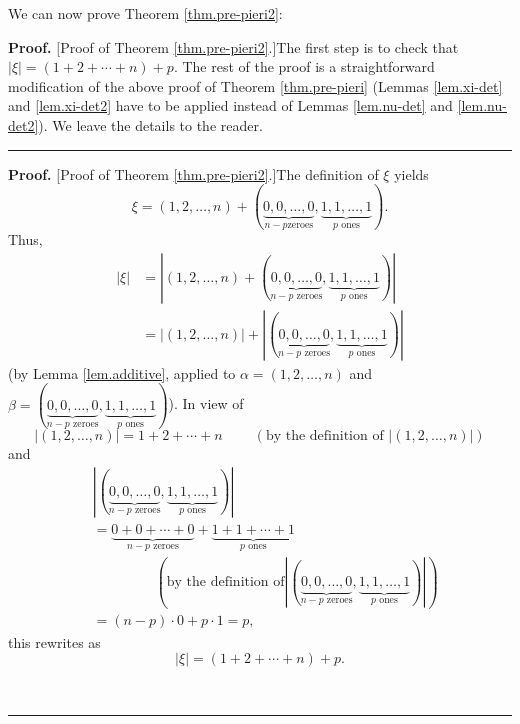 \documentclass
[numbers=enddot,12pt,final,onecolumn,notitlepage,english]{scrartcl}%
\theoremstyle{definition}
\newenvironment{proof}[1][Proof]{\noindent\textbf{#1.} }{\ \rule{0.5em}{0.5em}}
\newenvironment{verlong}{}{}
\newenvironment{vershort}{}{}
\begin{document}
We can now prove Theorem \ref{thm.pre-pieri2}:

\begin{vershort}
\begin{proof}
[Proof of Theorem \ref{thm.pre-pieri2}.]The first step is to check that
$\left\vert \xi\right\vert =\left(  1+2+\cdots+n\right)  +p$. The rest of the
proof is a straightforward modification of the above proof of Theorem
\ref{thm.pre-pieri} (Lemmas \ref{lem.xi-det} and \ref{lem.xi-det2} have to be
applied instead of Lemmas \ref{lem.nu-det} and \ref{lem.nu-det2}). We leave
the details to the reader.
\end{proof}
\end{vershort}

\begin{verlong}
\begin{proof}
[Proof of Theorem \ref{thm.pre-pieri2}.]The definition of $\xi$ yields%
\begin{equation}
\xi=\left(  1,2,\ldots,n\right)  +\left(  \underbrace{0,0,\ldots,0}_{n-p\text{
zeroes}},\underbrace{1,1,\ldots,1}_{p\text{ ones}}\right)  .
\label{pf.thm.pre-pieri2.1}%
\end{equation}
Thus,%
\begin{align*}
\left\vert \xi\right\vert  &  =\left\vert \left(  1,2,\ldots,n\right)
+\left(  \underbrace{0,0,\ldots,0}_{n-p\text{ zeroes}},\underbrace{1,1,\ldots
,1}_{p\text{ ones}}\right)  \right\vert \\
&  =\left\vert \left(  1,2,\ldots,n\right)  \right\vert +\left\vert \left(
\underbrace{0,0,\ldots,0}_{n-p\text{ zeroes}},\underbrace{1,1,\ldots
,1}_{p\text{ ones}}\right)  \right\vert
\end{align*}
(by Lemma \ref{lem.additive}, applied to $\alpha=\left(  1,2,\ldots,n\right)
$ and $\beta=\left(  \underbrace{0,0,\ldots,0}_{n-p\text{ zeroes}%
},\underbrace{1,1,\ldots,1}_{p\text{ ones}}\right)  $). In view of%
\[
\left\vert \left(  1,2,\ldots,n\right)  \right\vert =1+2+\cdots
+n\ \ \ \ \ \ \ \ \ \ \left(  \text{by the definition of }\left\vert \left(
1,2,\ldots,n\right)  \right\vert \right)
\]
and%
\begin{align*}
&  \left\vert \left(  \underbrace{0,0,\ldots,0}_{n-p\text{ zeroes}%
},\underbrace{1,1,\ldots,1}_{p\text{ ones}}\right)  \right\vert \\
&  =\underbrace{0+0+\cdots+0}_{n-p\text{ zeroes}}+\underbrace{1+1+\cdots
+1}_{p\text{ ones}}\\
&  \ \ \ \ \ \ \ \ \ \ \ \ \ \ \ \ \ \ \ \ \left(  \text{by the definition of
}\left\vert \left(  \underbrace{0,0,\ldots,0}_{n-p\text{ zeroes}%
},\underbrace{1,1,\ldots,1}_{p\text{ ones}}\right)  \right\vert \right) \\
&  =\left(  n-p\right)  \cdot0+p\cdot1=p,
\end{align*}
this rewrites as%
\begin{equation}
\left\vert \xi\right\vert =\left(  1+2+\cdots+n\right)  +p.
\label{pf.thm.pre-pieri2.sum-xi}%
\end{equation}



\end{proof}
\end{verlong}
\end{document}
